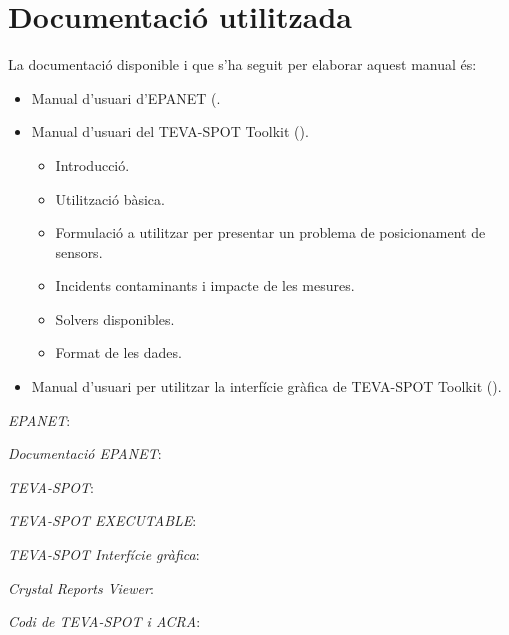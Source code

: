 \documentclass[12pt]{article}
\begin{document}
\clearpage
\section{Documentació utilitzada}
La documentació disponible i que s'ha seguit per elaborar aquest manual és:
\begin{itemize}
	\item Manual d'usuari d'EPANET (.
	\item Manual d'usuari del TEVA-SPOT Toolkit ().
	\begin{itemize}
		\item Introducció.
		\item Utilització bàsica.
		\item Formulació a utilitzar per presentar un problema de posicionament de sensors.
		\item Incidents contaminants i impacte de les mesures.
		\item Solvers disponibles.
		\item Format de les dades.
	\end{itemize}
	\item Manual d'usuari per utilitzar la interfície gràfica de TEVA-SPOT Toolkit ().
\end{itemize}




\clearpage
\begin{thebibliography}{9}
	\textit{EPANET}:
  	\\
  	
  	\textit{Documentació EPANET}:
  	\\
  	
	\textit{TEVA-SPOT}:
  	\\

  	\textit{TEVA-SPOT EXECUTABLE}:
  	\\

	\textit{TEVA-SPOT Interfície gràfica}:
  	\\
  	
	\textit{Crystal Reports Viewer}:
  	\\
  	
	\textit{Codi de TEVA-SPOT i ACRA}:
  	\\
\end{thebibliography}
\end{document}
